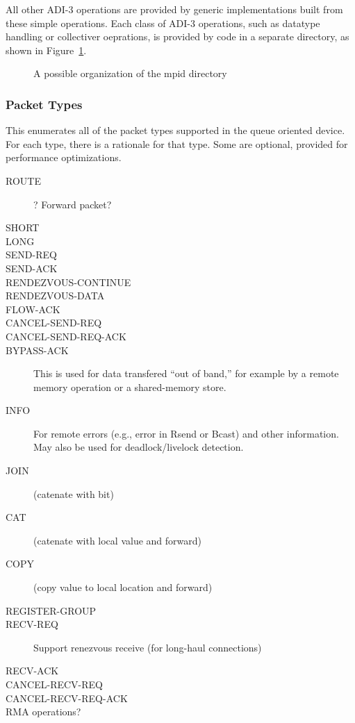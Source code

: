 \documentclass{article}
\begin{document}
All other ADI-3 operations are provided by generic implementations built from
these simple operations.  Each class of ADI-3 operations, such as datatype
handling or collectiver oeprations, is provided by code in a separate
directory, as shown in Figure~\ref{fig:mpid-dirs}.

\begin{figure}
\centerline{}
\caption{A possible organization of the mpid directory}
\label{fig:mpid-dirs}
\end{figure}

\subsubsection{Packet Types}
This enumerates all of the packet types supported in the queue oriented
device.  For each type, there is a rationale for that type.  Some are
optional, provided for performance optimizations.

\begin{description}
\item[ROUTE]? Forward packet?
\item[SHORT]
\item[LONG]
\item[SEND-REQ]
\item[SEND-ACK]
\item[RENDEZVOUS-CONTINUE]
\item[RENDEZVOUS-DATA]
\item[FLOW-ACK]
\item[CANCEL-SEND-REQ]
\item[CANCEL-SEND-REQ-ACK]
\item[BYPASS-ACK]This is used for data transfered ``out of band,'' for example
  by a remote memory operation or a shared-memory store.
\item[INFO]For remote errors (e.g., error in Rsend or Bcast) and other
  information.  May also be used for deadlock/livelock detection.

\item[JOIN](catenate with bit)
\item[CAT](catenate with local value and forward)
\item[COPY](copy value to local location and forward)
\item[REGISTER-GROUP]

\item[RECV-REQ]Support renezvous receive (for long-haul connections)
\item[RECV-ACK]
\item[CANCEL-RECV-REQ]
\item[CANCEL-RECV-REQ-ACK]

\item[RMA operations?]
\end{description}
\end{document}
